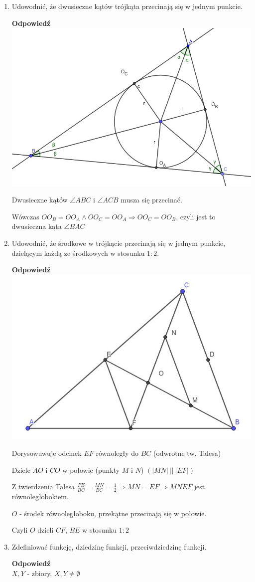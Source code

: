 \documentclass[12pt,a4paper]{article}
\theoremstyle{break}
\newcommand{\Odp}[1]{
		\begin{mdframed}[style=zadanie]
			\textbf{Odpowiedź}\\
			#1
		\end{mdframed}
	}
\begin{document}
\begin{enumerate}[1.]
{		Tworzymy proste równoległe do podtaw jak rysunek wyżej. Czerwone linie zawierają się w symetrialych $\Rightarrow$ przecinają się w jednym punkcie.
	}
	
	\item Udowodnić, że dwusieczne kątów trójkąta przecinają się w jednym punkcie.
	\Odp{
		\includegraphics[width=0.6\linewidth]{trj_proof_7.jpeg}
		
		Dwusieczne kątów $\angle ABC$ i $\angle ACB$ musza się przecinać.
	
		Wówczas $OO_B=OO_A \wedge OO_C=OO_A \Rightarrow OO_C=OO_B$, czyli jest to dwusieczna kąta $\angle BAC$ 
	}
	\newpage
	\item Udowodnić, że środkowe w trójkącie przecinają się w jednym punkcie, dzielącym każdą	ze środkowych w stosunku $1:2$.
	\Odp{
		\includegraphics[width=0.6\linewidth]{trj_proof_8.jpeg}
		
		Dorysowuwuje odcinek $EF$ równoległy do $BC$ (odwrotne tw. Talesa)
		
		Dziele $AO$ i $CO$ w połowie (punkty $M$ i $N$) $(|MN|\: ||\: |EF|)$
		
		Z twierdzenia Talesa $\frac{FE}{BC}=\frac{MN}{BC}=\frac{1}{2} \Rightarrow MN=EF \Rightarrow MNEF$ jest równoległobokiem.
		
		$O$ - środek równoległoboku, przekątne przecinają się w połowie.
		
		Czyli $O$ dzieli $CF$, $BE$ w stosunku $1:2$ 
	}
	
	\item Zdefiniować funkcję, dziedzinę funkcji, przeciwdziedzinę funkcji.
	\Odp{
		$X,Y$ - zbiory, $X,Y\neq \emptyset$
		
}
\end{enumerate}
\end{document}
